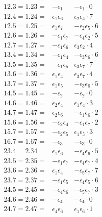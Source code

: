 \documentclass[11pt,a4paper]{article}
\begin{document}
\[
  \begin{array}{lll}
    12.3 = 1.23 = & -\epsilon_{1} & -\epsilon_{1} \cdot 0\\
    12.4 = 1.24 = & \epsilon_{1}\epsilon_{6} & \epsilon_{2}\epsilon_{4}\cdot 7\\
    12.5 = 1.25 = & \epsilon_{1}\epsilon_{7} & -\epsilon_{2}\epsilon_{5}\cdot 6\\
    12.6 = 1.26 = & -\epsilon_{1}\epsilon_{7} & -\epsilon_{4}\epsilon_{2}\cdot 5\\
    12.7 = 1.27 = & -\epsilon_{1}\epsilon_{6} & \epsilon_{3}\epsilon_{2}\cdot 4\\
    13.4 = 1.34 = & -\epsilon_{1}\epsilon_{4} & -\epsilon_{3}\epsilon_{6}\cdot 6\\
    13.5 = 1.35 = & -\epsilon_{1}\epsilon_{5} & \epsilon_{3}\epsilon_{7}\cdot 7\\
    13.6 = 1.36 = & \epsilon_{1}\epsilon_{4} & \epsilon_{3}\epsilon_{7}\cdot 4\\
    13.7 = 1.37 = & \epsilon_{1}\epsilon_{5} & -\epsilon_{3}\epsilon_{6}\cdot 5\\
    14.5 = 1.45 = & -\epsilon_{2} & -\epsilon_{2} \cdot 0\\
    14.6 = 1.46 = & \epsilon_{2}\epsilon_{4} & \epsilon_{1}\epsilon_{4}\cdot 3\\
    14.7 = 1.47 = & \epsilon_{2}\epsilon_{6} & -\epsilon_{1}\epsilon_{6}\cdot 2\\
    15.6 = 1.56 = & -\epsilon_{2}\epsilon_{4} & -\epsilon_{1}\epsilon_{7}\cdot 2\\
    15.7 = 1.57 = & -\epsilon_{2}\epsilon_{5} & \epsilon_{1}\epsilon_{5}\cdot 3\\
    16.7 = 1.67 = & -\epsilon_{3} & -\epsilon_{3} \cdot 0\\
    23.4 = 2.34 = & \epsilon_{1}\epsilon_{6} & -\epsilon_{4}\epsilon_{6}\cdot 5\\
    23.5 = 2.35 = & -\epsilon_{1}\epsilon_{7} & -\epsilon_{4}\epsilon_{7}\cdot 4\\
    23.6 = 2.36 = & \epsilon_{1}\epsilon_{4} & -\epsilon_{5}\epsilon_{7}\cdot 7\\
    23.7 = 2.37 = & -\epsilon_{1}\epsilon_{5} & -\epsilon_{4}\epsilon_{5}\cdot 6\\
    24.5 = 2.45 = & -\epsilon_{4}\epsilon_{6} & -\epsilon_{5}\epsilon_{7}\cdot 3\\
    24.6 = 2.46 = & -\epsilon_{4} & -\epsilon_{4} \cdot 0\\
    24.7 = 2.47 = & \epsilon_{4}\epsilon_{6} & \epsilon_{1}\epsilon_{6}\cdot 1\\

\end{array}\]
\end{document}
